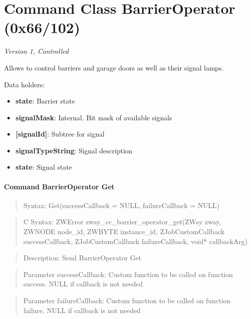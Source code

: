 \section{Command Class BarrierOperator (0x66/102)}

\textit{Version 1, Controlled}
\newline

Allows to control barriers and garage doors as well as their signal lamps.
\newline

\noindent
Data holders:

\begin{itemize}
\item \textbf{state}: Barrier state
\item \textbf{signalMask}: Internal. Bit mask of available signals
\item \textbf{[signalId]}: Subtree for signal
\item \qquad\textbf{signalTypeString}: Signal description
\item \qquad\textbf{state}: Signal state
\end{itemize}

\paragraph{Command BarrierOperator Get}
\begin{quote}Syntax: Get(successCallback = NULL, failureCallback = NULL)\end{quote}
\begin{quote}C Syntax: ZWError zway\_cc\_barrier\_operator\_get(ZWay zway, ZWNODE node\_id, ZWBYTE instance\_id, ZJobCustomCallback successCallback, ZJobCustomCallback failureCallback, void* callbackArg)\end{quote}
\begin{quote}Description: Send BarrierOperator Get\end{quote}
\begin{quote}Parameter successCallback: Custom function to be called on function success. NULL if callback is not needed\end{quote}
\begin{quote}Parameter failureCallback: Custom function to be called on function failure. NULL if callback is not needed\end{quote}


